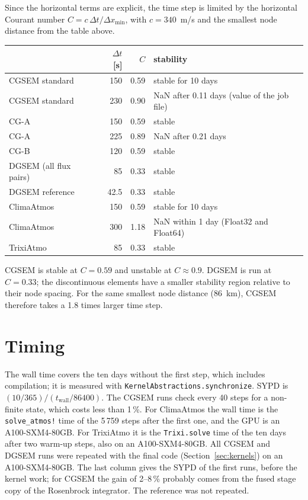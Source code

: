 \documentclass[11pt,a4paper]{article}
\newcommand{\code}[1]{\texttt{#1}}
\begin{document}
Since the horizontal terms are explicit, the time step is limited by
the horizontal Courant number $C=c\,\Delta t/\Delta x_\text{min}$, with
$c=340$~m/s and the smallest node distance from the table above.

\begin{center}
\small
\begin{tabular}{lrrl}
\toprule
 & $\Delta t$ [s] & $C$ & stability \\
\midrule
CGSEM standard & 150 & 0.59 & stable for 10 days \\
CGSEM standard & 230 & 0.90 & NaN after 0.11 days (value of the job file) \\
CG-A           & 150 & 0.59 & stable \\
CG-A           & 225 & 0.89 & NaN after 0.21 days \\
CG-B           & 120 & 0.59 & stable \\
DGSEM (all flux pairs) & 85 & 0.33 & stable \\
DGSEM reference& 42.5 & 0.33 & stable \\
ClimaAtmos     & 150 & 0.59 & stable for 10 days \\
ClimaAtmos     & 300 & 1.18 & NaN within 1 day (Float32 and Float64) \\
TrixiAtmo      & 85 & 0.33 & stable \\
\bottomrule
\end{tabular}
\end{center}

CGSEM is stable at $C=0.59$ and unstable at $C\approx0.9$. DGSEM is run
at $C=0.33$; the discontinuous elements have a smaller stability region
relative to their node spacing. For the same
smallest node distance (86~km), CGSEM therefore takes a 1.8 times
larger time step.

\section{Timing}

The wall time covers the ten days without the first step, which
includes compilation; it is measured with
\code{KernelAbstractions.synchronize}. SYPD is
$(10/365)/(t_\text{wall}/86400)$. The CGSEM runs check every 40 steps
for a non-finite state, which costs less than 1\,\%. For ClimaAtmos the
wall time is the \code{solve\_atmos!} time of the 5\,759 steps after the
first one, and the GPU is an A100-SXM4-80GB. For TrixiAtmo it is the
\code{Trixi.solve} time of the ten days after two warm-up steps, also on an
A100-SXM4-80GB. All CGSEM and DGSEM runs were repeated with the final
code (Section~\ref{sec:kernels}) on an A100-SXM4-80GB. The last column
gives the SYPD of the first runs, before the kernel work; for CGSEM the
gain of 2--8\,\% probably comes from the fused stage copy of the
Rosenbrock integrator. The reference was not repeated.
\end{document}
